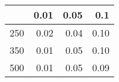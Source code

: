 % 
\begin{tabular}{rrrr}
  \hline
 & 0.01 & 0.05 & 0.1 \\ 
  \hline
250 & 0.02 & 0.04 & 0.10 \\ 
  350 & 0.01 & 0.05 & 0.10 \\ 
  500 & 0.01 & 0.05 & 0.09 \\ 
   \hline
\end{tabular}
